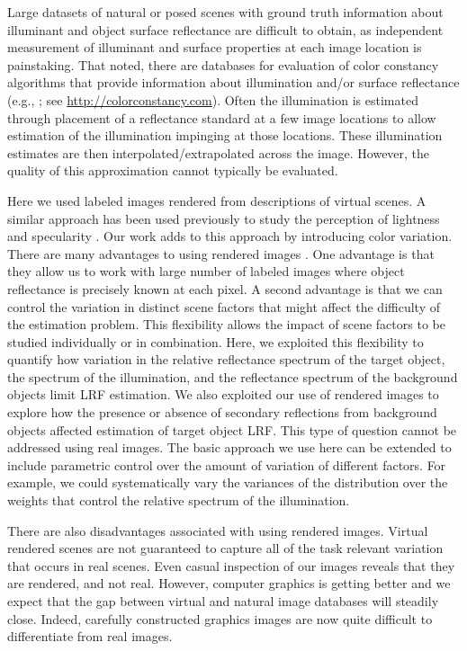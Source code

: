 \documentclass{jov}
\begin{document}
Large datasets of natural or posed scenes with ground truth information about illuminant and object surface reflectance are difficult to obtain, as independent measurement of illuminant and surface properties at each image location is painstaking. That noted, there are databases for evaluation of color constancy algorithms that provide information about illumination and/or surface reflectance (e.g., ; see \href{http://colorconstancy.com}{http://colorconstancy.com}). Often the illumination is estimated through placement of a reflectance standard at a few image locations to allow estimation of the illumination impinging at those locations. These illumination estimates are then interpolated/extrapolated across the image. However, the quality of this approximation cannot typically be evaluated. 

Here we used labeled images rendered from descriptions of virtual scenes. 
A similar approach has been used previously to study the perception of lightness and specularity \cite{toscani2013optimal,wiebel2015statistical,toscani2017lightness}. 
Our work adds to this approach by introducing color variation. 
There are many advantages to using rendered images \cite{Butler:ECCV:2012}. 
One advantage is that they allow us to work with large number of labeled images where object reflectance is precisely known at each pixel. A second advantage is that we can control the variation in distinct scene factors that might affect the difficulty of the estimation problem. This flexibility allows the impact of scene factors to be studied individually or in combination. Here, we exploited this flexibility to quantify how variation in the relative reflectance spectrum of the target object, the spectrum of the illumination, and the reflectance spectrum of the background objects limit LRF estimation. We also exploited our use of rendered images to explore how the presence or absence of secondary reflections from background objects affected estimation of target object LRF. This type of question cannot be addressed using real images. The basic approach we use here can be extended to include parametric control over the amount of variation of different factors. For example, we could systematically vary the variances of the distribution over the weights that control the relative spectrum of the illumination.

There are also disadvantages associated with using rendered images. 
Virtual rendered scenes are not guaranteed to capture all of the task relevant variation that occurs in real scenes.
Even casual inspection of our images reveals that they are rendered, and not real.
However, computer graphics is getting better and we expect that the gap between virtual and natural image databases will steadily close.
Indeed, carefully constructed graphics images are now quite difficult to differentiate from real images.
\end{document}
